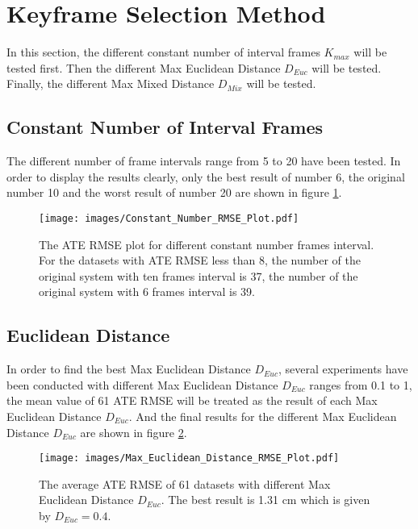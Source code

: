 \section{Keyframe Selection Method}
In this section, the different constant number of interval frames $K_{max}$ will be tested first. Then the different Max Euclidean Distance $D_{Euc}$ will be tested. Finally, the different Max Mixed Distance $D_{Mix}$ will be tested.

\subsection{Constant Number of Interval Frames}
The different number of frame intervals range from 5 to 20 have been tested. In order to display the results clearly, only the best result of number 6, the original number 10 and the worst result of number 20 are shown in figure \ref{Constant_Number_RMSE_Plot}.
\begin{figure}[thb]
    \centering
    \texttt{[image: images/Constant\_Number\_RMSE\_Plot.pdf]}
    \caption[The ATE RMSE plot for different constant number frames interval]{The ATE RMSE plot for different constant number frames interval. For the datasets with ATE RMSE less than 8, the number of the original system with ten frames interval is 37, the number of the original system with 6 frames interval is 39.}\label{Constant_Number_RMSE_Plot}
\end{figure}

\subsection{Euclidean Distance}
In order to find the best Max Euclidean Distance $D_{Euc}$, several experiments have been conducted with different Max Euclidean Distance $D_{Euc}$ ranges from 0.1 to 1, the mean value of 61 ATE RMSE will be treated as the result of each Max Euclidean Distance $D_{Euc}$. And the final results for the different Max Euclidean Distance $D_{Euc}$ are shown in figure \ref{Max_Euclidean_Distance_RMSE_Plot}. 
\begin{figure}[thb]
    \centering
    \texttt{[image: images/Max\_Euclidean\_Distance\_RMSE\_Plot.pdf]}
    \caption[The average ATE RMSE of 61 datasets with different Max Euclidean Distance $D_{Euc}$]{The average ATE RMSE of 61 datasets with different Max Euclidean Distance $D_{Euc}$. The best result is 1.31 cm which is given by $D_{Euc}=0.4$.}\label{Max_Euclidean_Distance_RMSE_Plot}
\end{figure}

